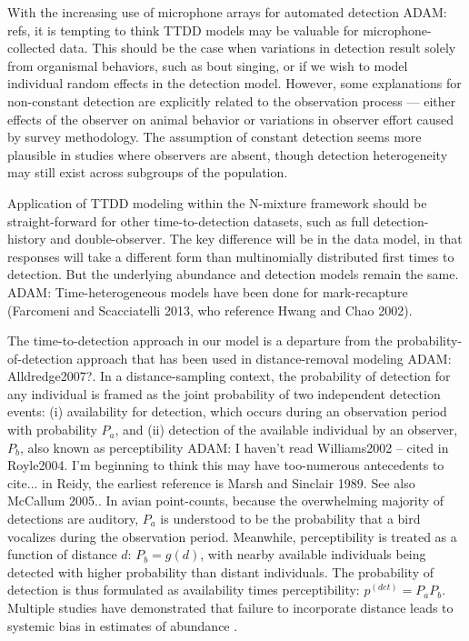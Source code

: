 \documentclass[useAMS,usenatbib,referee,12pt]{article}
\newcommand{\adam}[1]{{\color{blue} ADAM: #1}}
\begin{document}
With the increasing use of microphone arrays for automated detection \adam{refs}, it is tempting to think TTDD models may be valuable for microphone-collected data.  
This should be the case when variations in detection result solely from organismal behaviors, such as bout singing, or if we wish to model individual random effects in the detection model.  
However, some explanations for non-constant detection are explicitly related to the observation process --- either effects of the observer on animal behavior or variations in observer effort caused by survey methodology.  
The assumption of constant detection seems more plausible in studies where observers are absent, though detection heterogeneity may still exist across subgroups of the population.

Application of TTDD modeling within the N-mixture framework should be straight-forward for other time-to-detection datasets, such as full detection-history and double-observer.  
The key difference will be in the data model, in that responses will take a different form than multinomially distributed first times to detection.  
But the underlying abundance and detection models remain the same.  
\adam{Time-heterogeneous models have been done for mark-recapture (Farcomeni and Scacciatelli 2013, who reference Hwang and Chao 2002).}

The time-to-detection approach in our model is a departure from the probability-of-detection approach that has been used in distance-removal modeling \citep{Farnsworth2005, Diefenbach2007, Solymos2013, Amundson2014}\adam{Alldredge2007?}.  
In a distance-sampling context, the probability of detection for any individual is framed as the joint probability of two independent detection events: (i) availability for detection, which occurs during an observation period with probability $P_a$, and (ii) detection of the available individual by an observer, $P_b$, also known as perceptibility \citep{Williams2002, Kery2008, Nichols2009}\adam{I haven't read Williams2002 -- cited in Royle2004.  
I'm  beginning to think this may have too-numerous antecedents to cite... in Reidy, the earliest reference is Marsh and Sinclair 1989.  
See also McCallum 2005.}.  
In avian point-counts, because the overwhelming majority of detections are auditory, $P_a$ is understood to be the probability that a bird vocalizes during the observation period.  
Meanwhile, perceptibility is treated as a function of distance $d$: $P_b = g(d)$, with nearby available individuals being detected with higher probability than distant individuals.  
The probability of detection is thus formulated as availability times perceptibility: $p^{(det)} = P_aP_b$.  
Multiple studies have demonstrated that failure to incorporate distance leads to systemic bias in estimates of abundance \citep{EffordDawson2009, Solymos2013}.
\end{document}
